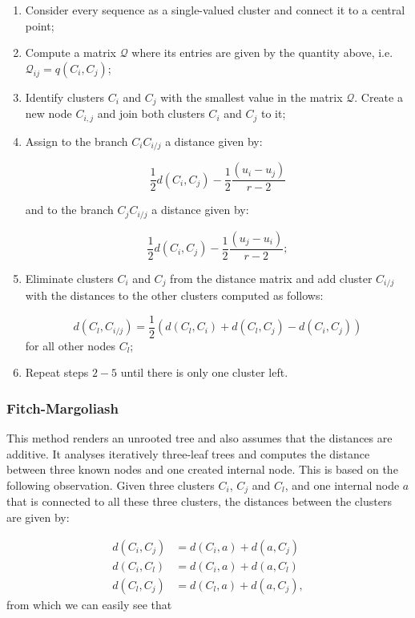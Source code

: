 \begin{enumerate}
    \item Consider every sequence as a single-valued cluster and connect it to a central point;
    \item Compute a matrix $\mathcal{Q}$ where its entries are given by the quantity above, i.e. $\mathcal{Q}_{ij} = q(C_i,C_j)$;
    \item Identify clusters $C_i$ and $C_j$ with the smallest value in the matrix $\mathcal{Q}$. Create a new node $C_{i,j}$ and join both clusters $C_i$ and $C_j$ to it;
    \item Assign to the branch $C_i C_{i/j}$ a distance given by:
    
    $$\frac{1}{2}d(C_i, C_j) - \frac{1}{2}\frac{(u_i - u_j)}{r-2}$$
    
    and to the branch $C_j C_{i/j}$ a distance given by:
    
    $$\frac{1}{2}d(C_i, C_j) - \frac{1}{2}\frac{(u_j - u_i)}{r-2};$$
    
    \item Eliminate clusters $C_i$ and $C_j$ from the distance matrix and add cluster $C_{i/j}$ with the distances to the other clusters computed as follows:
    
    $$d(C_l, C_{i/j}) = \frac{1}{2}(d(C_l, C_i) + d(C_l, C_j) - d(C_i, C_j))$$
    for all other nodes $C_l$;
    
    \item Repeat steps $2-5$ until there is only one cluster left.
\end{enumerate}


\subsubsection{Fitch-Margoliash}

This method renders an unrooted tree and also assumes that the distances are additive. It analyses iteratively three-leaf trees and computes the distance between three known nodes and one created internal node. This is based on the following observation. Given three clusters $C_i$, $C_j$ and $C_l$, and one internal node $a$ that is connected to all these three clusters, the distances between the clusters are given by:

\begin{eqnarray}
d(C_i, C_j) &= d(C_i, a) + d(a, C_j) \nonumber \\
d(C_i, C_l) &= d(C_i, a) + d(a, C_l) \nonumber\\
d(C_l, C_j) &= d(C_l, a) + d(a, C_j), \nonumber
\end{eqnarray}
from which we can easily see that 

